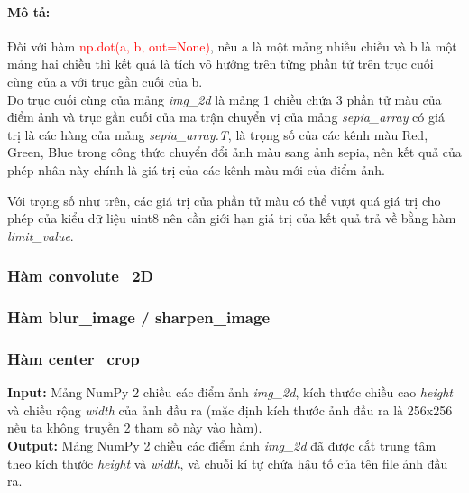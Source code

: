 \documentclass{article}
\begin{document}
\paragraph{Mô tả:}
Đối với hàm \textcolor{red}{np.dot(a, b, out=None)}, nếu a là một mảng nhiều chiều và b là một mảng hai chiều thì kết quả là tích vô hướng trên từng phần tử trên trục cuối cùng của a với trục gần cuối của b.\\
Do trục cuối cùng của mảng \textit{img\_2d} là mảng 1 chiều chứa 3 phần tử màu của điểm ảnh và trục gần cuối của ma trận chuyển vị của mảng \textit{sepia\_array} có giá trị là các hàng của mảng \textit{sepia\_array.T}, là trọng số của các kênh màu Red, Green, Blue trong công thức chuyển đổi ảnh màu sang ảnh sepia, nên kết quả của phép nhân này chính là giá trị của các kênh màu mới của điểm ảnh. \par
Với trọng số như trên, các giá trị của phần tử màu có thể vượt quá giá trị cho phép của kiểu dữ liệu uint8 nên cần giới hạn giá trị của kết quả trả về bằng hàm \textit{limit\_value}.

\subsubsection{Hàm convolute\_2D}
\subsubsection{Hàm blur\_image / sharpen\_image}

\subsubsection{Hàm center\_crop}
\textbf{Input:} Mảng NumPy 2 chiều các điểm ảnh \textit{img\_2d}, kích thước chiều cao \textit{height} và chiều rộng \textit{width} của ảnh đầu ra (mặc định kích thước ảnh đầu ra là 256x256 nếu ta không truyền 2 tham số này vào hàm). \\
\textbf{Output:} Mảng NumPy 2 chiều các điểm ảnh \textit{img\_2d} đã được cắt trung tâm theo kích thước \textit{height} và \textit{width}, và chuỗi kí tự chứa hậu tố của tên file ảnh đầu ra. \\
\end{document}
